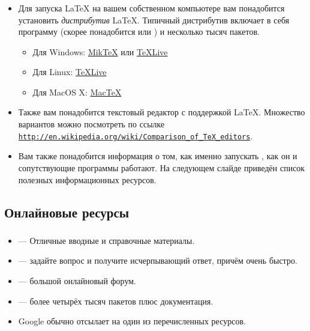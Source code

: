 \documentclass{beamer}
\begin{document}
\begin{frame}
\frametitle{\insertsubsection}
\begin{itemize}
\item Для запуска \LaTeX{} на вашем собственном компьютере вам понадобится установить
\emph{дистрибутив} \LaTeX{}. Типичный дистрибутив включает в себя программу 
(скорее понадобится  или ) и несколько тысяч пакетов.
\begin{itemize}
\item Для Windows: \href{http://miktex.org/}{Mik\TeX} или \href{http://tug.org/texlive/}{\TeX Live}
\item Для Linux: \href{http://tug.org/texlive/}{\TeX Live}
\item Для MacOS X: \href{http://tug.org/mactex/}{Mac\TeX}
\end{itemize}
\item Также вам понадобится текстовый редактор с поддержкой \LaTeX{}. Множество
вариантов можно посмотреть по ссылке
\href{http://en.wikipedia.org/wiki/Comparison_of_TeX_editors}%
{\mbox{\texttt{http://en.wikipedia.org/wiki/Comparison\_of\_TeX\_editors}}}.
\item Вам также понадобится информация о том, как именно запускать ,
как он и сопутствующие программы работают. На следующем слайде приведён список
полезных информационных ресурсов.
\end{itemize}
\end{frame}

\subsection{Онлайновые ресурсы}

\begin{frame}
\frametitle{\insertsubsection}
\begin{itemize}
\item {} ---
Отличные вводные и справочные материалы.
\item {} --- задайте
вопрос и получите исчерпывающий ответ, причём очень быстро.
\item {} --- большой
онлайновый форум.
\item {} ---
более четырёх тысяч пакетов плюс документация.
\item Google обычно отсылает на один из перечисленных ресурсов.
\end{itemize}
\end{frame}
\end{document}
